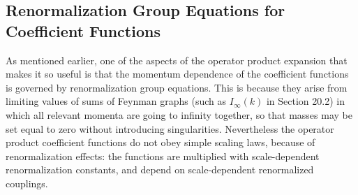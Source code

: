 
\subsection{Renormalization Group Equations for Coefficient Functions}

As mentioned earlier, one of the aspects of the operator product expansion that makes it so useful is that the momentum dependence of the coefficient functions is governed by renormalization group equations. This is because they arise from limiting values of sums of Feynman graphs (such as $I_\infty(k)$ in Section 20.2) in which all relevant momenta are going to infinity together, so that masses may be set equal to zero without introducing singularities. Nevertheless the operator product coefficient functions do not obey simple scaling laws, because of renormalization effects: the functions are multiplied with scale-dependent renormalization constants, and depend on scale-dependent renormalized couplings.

